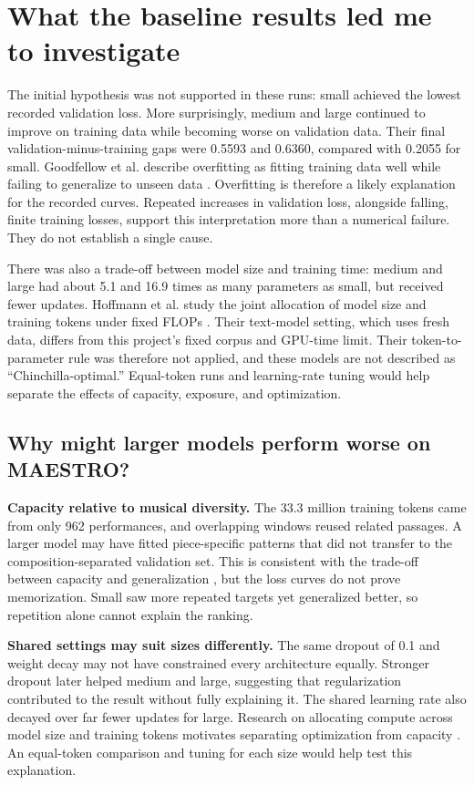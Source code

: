 \section{What the baseline results led me to investigate}
\label{sec:baselineanalysis}
The initial hypothesis was not supported in these runs: small achieved the lowest recorded validation loss. More surprisingly, medium and large continued to improve on training data while becoming worse on validation data. Their final validation-minus-training gaps were 0.5593 and 0.6360, compared with 0.2055 for small. Goodfellow et al. describe overfitting as fitting training data well while failing to generalize to unseen data \citep[Chapter~5]{goodfellow2016deep}. Overfitting is therefore a likely explanation for the recorded curves. Repeated increases in validation loss, alongside falling, finite training losses, support this interpretation more than a numerical failure. They do not establish a single cause.

There was also a trade-off between model size and training time: medium and large had about 5.1 and 16.9 times as many parameters as small, but received fewer updates. Hoffmann et al. study the joint allocation of model size and training tokens under fixed FLOPs \citep{hoffmann2022compute}. Their text-model setting, which uses fresh data, differs from this project's fixed corpus and GPU-time limit. Their token-to-parameter rule was therefore not applied, and these models are not described as ``Chinchilla-optimal.'' Equal-token runs and learning-rate tuning would help separate the effects of capacity, exposure, and optimization.

\subsection*{Why might larger models perform worse on MAESTRO?}
\textbf{Capacity relative to musical diversity.} The 33.3 million training tokens came from only 962 performances, and overlapping windows reused related passages. A larger model may have fitted piece-specific patterns that did not transfer to the composition-separated validation set. This is consistent with the trade-off between capacity and generalization \citep[Chapter~5]{goodfellow2016deep}, but the loss curves do not prove memorization. Small saw more repeated targets yet generalized better, so repetition alone cannot explain the ranking.

\textbf{Shared settings may suit sizes differently.} The same dropout of 0.1 and weight decay may not have constrained every architecture equally. Stronger dropout later helped medium and large, suggesting that regularization contributed to the result without fully explaining it. The shared learning rate also decayed over far fewer updates for large. Research on allocating compute across model size and training tokens motivates separating optimization from capacity \citep{hoffmann2022compute}. An equal-token comparison and tuning for each size would help test this explanation.

